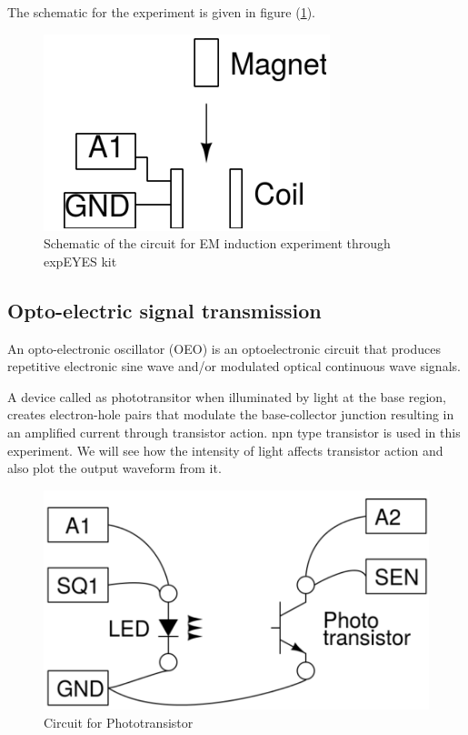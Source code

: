 \documentclass[%
 aip,
 amsmath,amssymb,
 reprint, floatfix%
]{revtex4-1}
\begin{document}
    The schematic for the experiment is given in figure (\ref{fig:emschem}).
    \begin{figure}
        \centering
        \includegraphics[scale = 0.6]{Figures/emSchematic.png}
        \caption{Schematic of the circuit for EM induction experiment through expEYES kit}
        \label{fig:emschem}
    \end{figure}
    \subsection{Opto-electric signal transmission}
    An opto-electronic oscillator (OEO) is an optoelectronic circuit that produces repetitive electronic sine wave and/or modulated optical continuous wave signals.
    \par
    A device called as phototransitor when illuminated by light at the base region, creates electron-hole pairs that modulate the base-collector junction resulting in an amplified current through transistor action. npn type transistor is used in this experiment. We will see how the intensity of light affects transistor action and also plot the output waveform from it.
    \begin{figure}
        \centering
        \includegraphics[scale = 0.5]{Figures/photoTra.png}
        \caption{Circuit for Phototransistor}
        \label{fig:photo}
    \end{figure}
\end{document}
